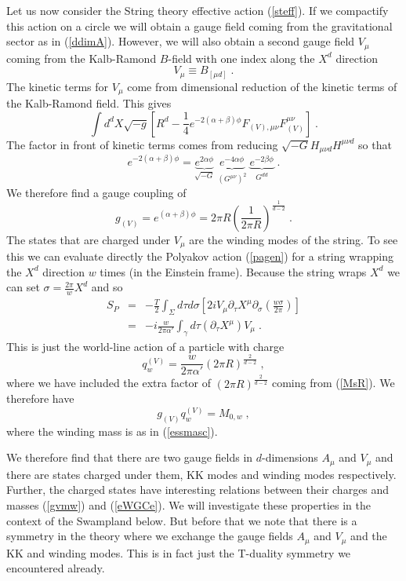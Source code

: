 \documentclass[11pt,a4paper]{article}
\numberwithin{equation}{section}
\numberwithin{table}{section}\setlength{\multlinegap}{25pt}
\newcommand{\bea}{\begin{eqnarray}}  \newcommand{\eea}{\end{eqnarray}}
\newcommand{\nn}{\nonumber}
\newcommand{\be}{\begin{equation}}
\newcommand{\ee}{\end{equation}}
\begin{document}
Let us now consider the String theory effective action (\ref{steff}). If we compactify this action on a circle we will obtain a gauge field coming from the gravitational sector as in (\ref{ddimA}). However, we will also obtain a second gauge field $V_{\mu}$ coming from the Kalb-Ramond $B$-field with one index along the $X^d$ direction
\be
V_{\mu} \equiv B_{[\mu d]} \;.
\ee
The kinetic terms for $V_{\mu}$ come from dimensional reduction of the kinetic terms of the Kalb-Ramond field. This gives
\be
\int d^dX \sqrt{-g} \left[R^d - \frac14 e^{-2\left(\alpha+\beta\right) \phi}F_{{(V)},\mu\nu}F_{(V)}^{\mu\nu}\right] \;.
\ee
The factor in front of kinetic terms comes from reducing $\sqrt{-G} H_{\mu\nu d}H^{\mu\nu d}$ so that 
\be
e^{-2\left(\alpha+\beta\right) \phi} = \underbrace{e^{2\alpha \phi}}_{\sqrt{-G}} \; \underbrace{e^{-4\alpha \phi}}_{\left(G^{\mu\nu}\right)^2}\; \underbrace{e^{-2\beta \phi}}_{G^{dd}} \;.
\ee
We therefore find a gauge coupling of 
\be
g_{(V)} = e^{\left(\alpha+\beta\right)\phi} = 2 \pi R \left(\frac{1}{2\pi R}\right)^{\frac{1}{d-2}}  \;.
\ee
The states that are charged under $V_{\mu}$ are the winding modes of the string. To see this we can evaluate directly the Polyakov action (\ref{pagen}) for a string wrapping the $X^d$ direction $w$ times (in the Einstein frame). Because the string wraps $X^d$ we can set $\sigma=\frac{2 \pi}{w} X^d$ and so
\bea
S_P &=& -\frac{T}{2} \int_{\Sigma} d \tau d \sigma \left[ 2 i V_{\mu} \partial_{\tau} X^{\mu} \partial_{\sigma} \left(\frac{ w \sigma}{2\pi} \right)\right] \nn \\
&=& -i \frac{w}{2\pi \alpha'}\int_{\gamma} d\tau \left(\partial_{\tau} X^{\mu}\right) V_{\mu}
\label{cpwl} \;.
\eea
This is just the world-line action of a particle with charge
\be
q^{(V)}_w = \frac{w}{2\pi \alpha'} \left(2 \pi R \right)^{\frac{2}{d-2}}\;,
\ee
where we have included the extra factor of $\left(2 \pi R \right)^{\frac{2}{d-2}}$ coming from (\ref{MsR}). 
We therefore have
\be
g_{(V)}q^{(V)}_w  = M_{0,w} \;,
\label{gvmw}
\ee
where the winding mass is as in (\ref{essmasc}).

We therefore find that there are two gauge fields in $d$-dimensions $A_{\mu}$ and $V_{\mu}$ and there are states charged under them, KK modes and winding modes respectively. Further, the charged states have interesting relations between their charges and masses (\ref{gvmw}) and (\ref{eWGCe}). We will investigate these properties in the context of the Swampland below. But before that we note that there is a symmetry in the theory where we exchange the gauge fields $A_{\mu}$ and $V_{\mu}$ and the KK and winding modes. This is in fact just the T-duality symmetry we encountered already. 
\end{document}

